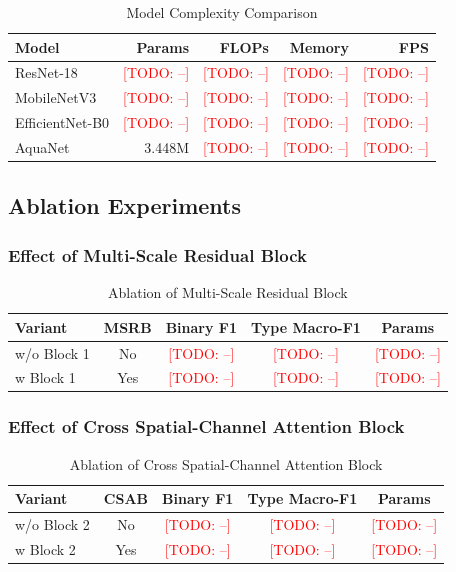 \documentclass[journal]{IEEEtran}
\newcommand{\todo}[1]{\textcolor{red}{[TODO: #1]}}
\newcommand{\method}{AquaNet}
\newcommand{\msrb}{MSRB}
\newcommand{\csab}{CSAB}
\begin{document}
\begin{table}[!t]
\centering
\caption{Model Complexity Comparison}
\label{tab:model_complexity}
\begin{tabular}{lrrrr}
\toprule
\textbf{Model} & \textbf{Params} & \textbf{FLOPs} & \textbf{Memory} & \textbf{FPS} \\
\midrule
ResNet-18 & \todo{--} & \todo{--} & \todo{--} & \todo{--} \\
MobileNetV3 & \todo{--} & \todo{--} & \todo{--} & \todo{--} \\
EfficientNet-B0 & \todo{--} & \todo{--} & \todo{--} & \todo{--} \\
\method{} & 3.448M & \todo{--} & \todo{--} & \todo{--} \\
\bottomrule
\end{tabular}
\end{table}

\subsection{Ablation Experiments}
\label{subsec:ablation}

\subsubsection{Effect of Multi-Scale Residual Block}
\begin{table}[!t]
\centering
\caption{Ablation of Multi-Scale Residual Block}
\label{tab:ablation_msrb}
\begin{tabular}{lcccc}
\toprule
\textbf{Variant} & \textbf{\msrb{}} & \textbf{Binary F1} & \textbf{Type Macro-F1} & \textbf{Params} \\
\midrule
w/o Block 1 & No & \todo{--} & \todo{--} & \todo{--} \\
w Block 1 & Yes & \todo{--} & \todo{--} & \todo{--} \\
\bottomrule
\end{tabular}
\end{table}

\subsubsection{Effect of Cross Spatial-Channel Attention Block}
\begin{table}[!t]
\centering
\caption{Ablation of Cross Spatial-Channel Attention Block}
\label{tab:ablation_csab}
\begin{tabular}{lcccc}
\toprule
\textbf{Variant} & \textbf{\csab{}} & \textbf{Binary F1} & \textbf{Type Macro-F1} & \textbf{Params} \\
\midrule
w/o Block 2 & No & \todo{--} & \todo{--} & \todo{--} \\
w Block 2 & Yes & \todo{--} & \todo{--} & \todo{--} \\
\bottomrule
\end{tabular}
\end{table}
\end{document}
